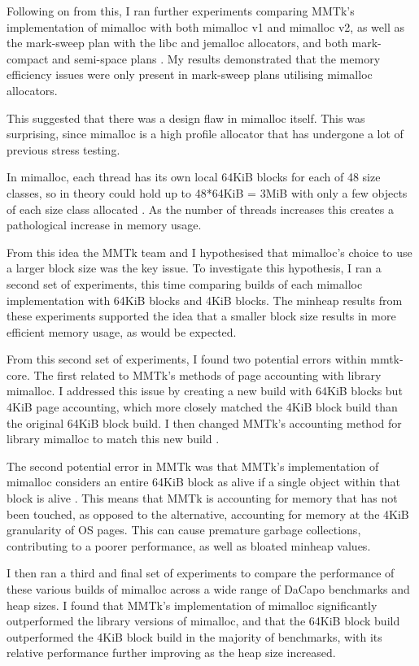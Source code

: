 \documentclass{article}
\begin{document}
Following on from this, I ran further experiments comparing MMTk's implementation of mimalloc with both mimalloc v1 and mimalloc v2, as well as the mark-sweep plan with the libc and jemalloc allocators, and both mark-compact and semi-space plans \cite{evans2006scalable,mmtk-core}. My results demonstrated that the memory efficiency issues were only present in mark-sweep plans utilising mimalloc allocators.

This suggested that there was a design flaw in mimalloc itself. This was surprising, since mimalloc is a high profile allocator that has undergone a lot of previous stress testing.

In mimalloc, each thread has its own local 64KiB blocks for each of 48 size classes, so in theory could hold up to 48*64KiB = 3MiB with only a few objects of each size class allocated \cite{mimalloc,mmtk-core}. As the number of threads increases this creates a pathological increase in memory usage.

From this idea the MMTk team and I hypothesised that mimalloc's choice to use a larger block size was the key issue. To investigate this hypothesis, I ran a second set of experiments, this time comparing builds of each mimalloc implementation with 64KiB blocks and 4KiB blocks. The minheap results from these experiments supported the idea that a smaller block size results in more efficient memory usage, as would be expected.

From this second set of experiments, I found two potential errors within mmtk-core. The first related to MMTk's methods of page accounting with library mimalloc. I addressed this issue by creating a new build with 64KiB blocks but 4KiB page accounting, which more closely matched the 4KiB block build than the original 64KiB block build. I then changed MMTk's accounting method for library mimalloc to match this new build \cite{pr747}.

The second potential error in MMTk was that MMTk's implementation of mimalloc considers an entire 64KiB block as alive if a single object within that block is alive \cite{mmtk-core}. This means that MMTk is accounting for memory that has not been touched, as opposed to the alternative, accounting for memory at the 4KiB granularity of OS pages. This can cause premature garbage collections, contributing to a poorer performance, as well as bloated minheap values.

I then ran a third and final set of experiments to compare the performance of these various builds of mimalloc across a wide range of DaCapo benchmarks and heap sizes. I found that MMTk's implementation of mimalloc significantly outperformed the library versions of mimalloc, and that the 64KiB block build outperformed the 4KiB block build in the majority of benchmarks, with its relative performance further improving as the heap size increased.
\end{document}
